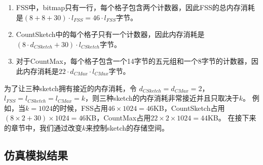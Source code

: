 \begin{enumerate}
\item 
FSS中，bitmap只有一行，每个格子包含两个计数器，因此FSS的总内存消耗是$(8+8+30)\cdot l_{FSS} = 46\cdot l_{FSS}$字节。
\item CountSketch中的每个格子只有一个计数器，因此内存消耗是$(8\cdot d_{CSketch} + 30)\cdot l_{CSketch}$字节。
\item 对于CountMax，每个格子包含一个14字节的五元组和一个8字节的计数器，因此内存消耗是$22 \cdot d_{CMax}\cdot l_{CMax}$字节。
\end{enumerate}

为了让三种sketch拥有接近的内存消耗，令 $d_{CSketch}=d_{CMax}=2$，$l_{FSS}=l_{CSketch}=l_{CMax}=k$，则三种sketch的内存消耗非常接近并且只取决于$k$。
例如，当$k=1024$的时候，FSS占用$46 \times 1024 = 46$KB，CountSketch占用$(8\times 2 +30)\times 1024 = 46$KB，CountMax占用$22\times 2\times 1024=44$KB。
在接下来的章节中，我们通过改变$k$来控制sketch的存储空间。

\subsection{仿真模拟结果}


